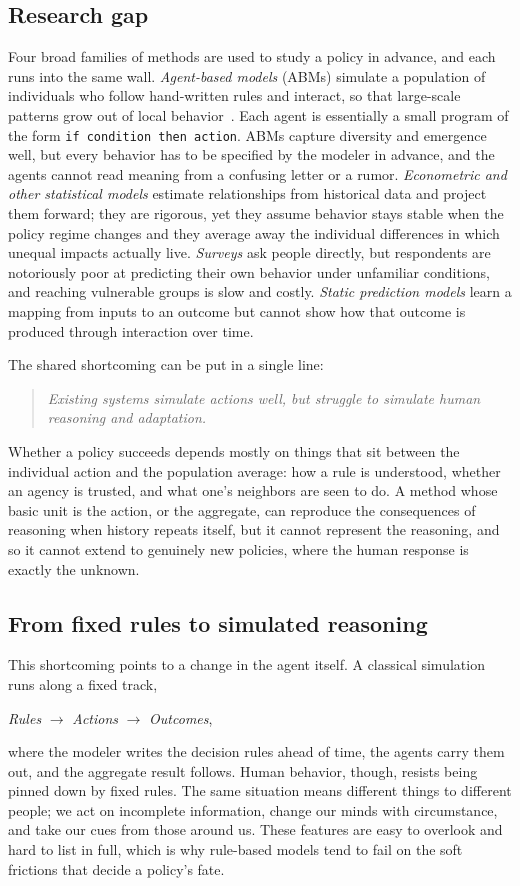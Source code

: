\documentclass[conference]{IEEEtran}
\begin{document}
\subsection{Research gap}
Four broad families of methods are used to study a policy in advance, and each runs into the same wall. \emph{Agent-based models} (ABMs) simulate a population of individuals who follow hand-written rules and interact, so that large-scale patterns grow out of local behavior~\cite{schelling1971,epstein1996}. Each agent is essentially a small program of the form \texttt{if condition then action}. ABMs capture diversity and emergence well, but every behavior has to be specified by the modeler in advance, and the agents cannot read meaning from a confusing letter or a rumor. \emph{Econometric and other statistical models} estimate relationships from historical data and project them forward; they are rigorous, yet they assume behavior stays stable when the policy regime changes and they average away the individual differences in which unequal impacts actually live. \emph{Surveys} ask people directly, but respondents are notoriously poor at predicting their own behavior under unfamiliar conditions, and reaching vulnerable groups is slow and costly. \emph{Static prediction models} learn a mapping from inputs to an outcome but cannot show how that outcome is produced through interaction over time.

The shared shortcoming can be put in a single line:
\begin{quote}
\emph{Existing systems simulate actions well, but struggle to simulate human reasoning and adaptation.}
\end{quote}
Whether a policy succeeds depends mostly on things that sit between the individual action and the population average: how a rule is understood, whether an agency is trusted, and what one's neighbors are seen to do. A method whose basic unit is the action, or the aggregate, can reproduce the consequences of reasoning when history repeats itself, but it cannot represent the reasoning, and so it cannot extend to genuinely new policies, where the human response is exactly the unknown.

\subsection{From fixed rules to simulated reasoning}
This shortcoming points to a change in the agent itself. A classical simulation runs along a fixed track,
\begin{center}
\textit{Rules} $\rightarrow$ \textit{Actions} $\rightarrow$ \textit{Outcomes},
\end{center}
where the modeler writes the decision rules ahead of time, the agents carry them out, and the aggregate result follows. Human behavior, though, resists being pinned down by fixed rules. The same situation means different things to different people; we act on incomplete information, change our minds with circumstance, and take our cues from those around us. These features are easy to overlook and hard to list in full, which is why rule-based models tend to fail on the soft frictions that decide a policy's fate.
\end{document}
